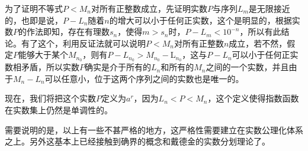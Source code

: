 为了证明不等式$P<M_n$对所有正整数成立，先证明实数$P$与序列$L_m$是无限接近的，也即是说，$P-L_n$随着$n$的增大可以小于任何正实数，这个是明显的，根据实数$P$的作法即知，存在有理数$s_n$，使得$m>s_n$时，$P-L_m<10^{-n}$，所以有此结论。有了这个，利用反证法就可以说明$P<M_n$对所有正整数$n$成立，若不然，假定$P$能够大于某个$M_{n_0}$，则有$P-L_{n_0}>M_{n_0}-$L$_{n_0}$，这与$P-L_n$可以小于任何正实数相矛盾，所以实数$P$确实是介于所有的$L_n$和所有的$M_n$之间的一个实数，并且由于$M_n-L_n$可以任意小，位于这两个序列之间的实数也是唯一的。

现在，我们将把这个实数$P$定义为$a^r$，因为$L_n < P < M_n$，这个定义使得指数函数在实数集上仍然是单调性的。

需要说明的是，以上有一些不甚严格的地方，这严格性需要建立在实数公理化体系之上。另外这基本上已经接触到确界的概念和戴德金的实数分划理论了。



